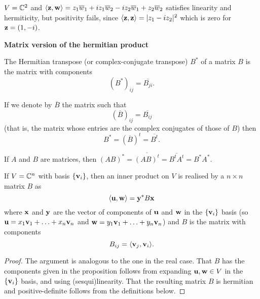 \documentclass[10pt, a4paper]{article}
\begin{document}
\begin{example}
    $V = \mathbb{C} ^ 2$ and $\langle\mathbf{z}, \mathbf{w}\rangle = z_1\overline{w}_1 + iz_1\overline{w}_2 - iz_2\overline{w}_1 + z_2\overline{w}_2$ satisfies linearity and hermiticity,
    but positivity fails,
    since $\langle\mathbf{z}, \mathbf{z}\rangle = |z_1 - iz_2| ^ 2$ which is zero for $\mathbf{z} = (1, -i)$.
\end{example}

\textbf{Matrix version of the hermitian product}

\begin{definition}
    The Hermitian transpose
    (or complex-conjugate transpose)
    $B ^ {*}$ of a matrix $B$ is the matrix with components
    \[
    (B ^ {*})_{ij} = \overline{B_{{ji}}}.
    \]
\end{definition}

\begin{remark}
    If we denote by $\overline{B}$ the matrix such that
    \[
    (\overline{B})_{ij} = \overline{B_{ij}}
    \]
    (that is,
    the matrix whose entries are the complex conjugates of those of $B$)
    then
    \[
    B ^ {*} = (\overline{B}) ^ t = \overline{B ^ t}.
    \]
\end{remark}

\begin{remark}
    If $A$ and $B$ are matrices,
    then $(AB) ^ {*} = \overline{(AB) ^ t} = \overline{B ^ tA ^ t} = B ^ {*}A ^ {*}$.
\end{remark}

\begin{proposition}
    If $V = \mathbb{C} ^ n$ with basis $\{\mathbf{v}_i\}$,
    then an inner product on $V$ is realised by a $n \times n$ matrix $B$ as
    \[
    \langle\mathbf{u}, \mathbf{w}\rangle = \mathbf{y} ^ {*}B\mathbf{x}
    \]
    where $\mathbf{x}$ and $\mathbf{y}$ are the vector of components of $\mathbf{u}$ and $\mathbf{w}$ in the $\{\mathbf{v}_i\}$ basis
    (so $\mathbf{u} = x_1\mathbf{v}_1 + \dotsc + x_n\mathbf{v}_n$ and $\mathbf{w} = y_1\mathbf{v}_1 + \dotsc + y_n\mathbf{v}_n$) and $B$ is the matrix with components
    \[
    B_{ij} = \langle\mathbf{v}_j, \mathbf{v}_i\rangle.
    \]

    \begin{proof}
        The argument is analogous to the one in the real case.
        That $B$ has the components given in the proposition follows from expanding $\mathbf{u}, \mathbf{w} \in V$ in the $\{\mathbf{v}_i\}$ basis,
        and using
        (sesqui)linearity.
        That the resulting matrix $B$ is hermitian and positive-definite follows from the definitions below.
    \end{proof}
\end{proposition}
\end{document}
